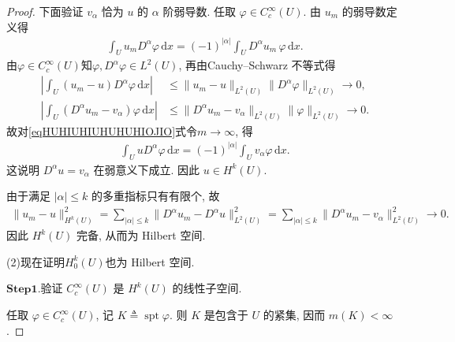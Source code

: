 \documentclass[../../main.tex]{subfiles}
\begin{document}
\begin{proof}
下面验证 $v_\alpha$ 恰为 $u$ 的 $\alpha$ 阶弱导数. 任取 $\varphi\in C_c^\infty(U)$. 由 $u_m$ 的弱导数定义得
\begin{align}\label{eqHUHIUHIUHUHUHIOJIO}
\int_U u_mD^\alpha\varphi\,\mathrm{d}x
=
(-1)^{|\alpha|}
\int_U D^\alpha u_m\,\varphi\,\mathrm{d}x.
\end{align}
由$\varphi\in C_c^\infty(U)$知$\varphi,D^\alpha\varphi\in L^2(U)$, 再由Cauchy--Schwarz 不等式得
\begin{align*}
\left|
\int_U (u_m-u)D^\alpha\varphi\,\mathrm{d}x
\right|
&\leqslant
\|u_m-u\|_{L^2(U)}
\|D^\alpha\varphi\|_{L^2(U)}
\longrightarrow 0,\\
\left|
\int_U (D^\alpha u_m-v_\alpha)\varphi\,\mathrm{d}x
\right|
&\leqslant
\|D^\alpha u_m-v_\alpha\|_{L^2(U)}
\|\varphi\|_{L^2(U)}
\longrightarrow 0.
\end{align*}
故对\eqref{eqHUHIUHIUHUHUHIOJIO}式令$m\to\infty$, 得
\begin{align*}
\int_U uD^\alpha\varphi\,\mathrm{d}x
=
(-1)^{|\alpha|}
\int_U v_\alpha\varphi\,\mathrm{d}x.
\end{align*}
这说明 $D^\alpha u=v_\alpha$ 在弱意义下成立. 因此 $u\in H^k(U)$.

由于满足 $|\alpha|\leqslant k$ 的多重指标只有有限个, 故
\begin{align*}
\|u_m-u\|_{H^k(U)}^2
=
\sum\limits_{|\alpha|\leqslant k}
\|D^\alpha u_m-D^\alpha u\|_{L^2(U)}^2
=
\sum\limits_{|\alpha|\leqslant k}
\|D^\alpha u_m-v_\alpha\|_{L^2(U)}^2
\longrightarrow 0.
\end{align*}
因此 $H^k(U)$ 完备, 从而为 Hilbert 空间.

(2)现在证明$H_0^k(U)$也为 Hilbert 空间.

\noindent$\mathbf{Step}\mathbf{1}.${\heiti 验证 $C_c^\infty(U)$ 是 $H^k(U)$ 的线性子空间.}

任取 $\varphi\in C_c^\infty(U)$, 记 $K\triangleq\operatorname{spt}\varphi$. 则 $K$ 是包含于 $U$ 的紧集, 因而 $m(K)<\infty$.


\end{proof}
\end{document}
